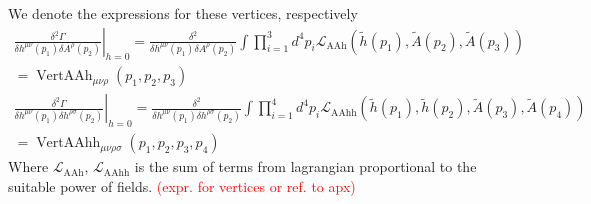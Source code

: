 \documentclass[11pt, a4paper]{article}
\begin{document}
We denote the expressions for these vertices, respectively
\begin{gather}
    \left. \frac{\delta^2 \Gamma}{\delta h^{\mu\nu}(p_1) \delta A^{\rho}(p_2)}\right|_{h=0} = \frac{\delta^2}{\delta h^{\mu\nu}(p_1) \delta A^{\rho}(p_2)} \int \prod_{i=1}^3 d^4 p_i \mathcal{L}_{\text{AAh}}\left(\tilde{h}(p_1), \tilde{A}(p_2), \tilde{A}(p_3)\right)\\
    = \operatorname{VertAAh}_{\mu\nu\rho}(p_1,p_2,p_3)\\
    \left. \frac{\delta^2 \Gamma}{\delta h^{\mu\nu}(p_1) \delta h^{\rho\sigma}(p_2)}\right|_{h=0} = \frac{\delta^2}{\delta h^{\mu\nu}(p_1) \delta h^{\rho\sigma}(p_2)} \int \prod_{i=1}^4 d^4 p_i \mathcal{L}_{\text{AAhh}}\left(\tilde{h}(p_1), \tilde{h}(p_2), \tilde{A}(p_3), \tilde{A}(p_4) \right)\\
     = \operatorname{VertAAhh}_{\mu\nu\rho\sigma}(p_1,p_2,p_3,p_4)
\end{gather}
Where $\mathcal{L}_{\text{AAh}}$, $\mathcal{L}_{\text{AAhh}}$ is the sum of terms from lagrangian proportional to the suitable power of fields.
\textcolor{red}{(expr. for vertices or ref. to apx)}
 
\end{document}
